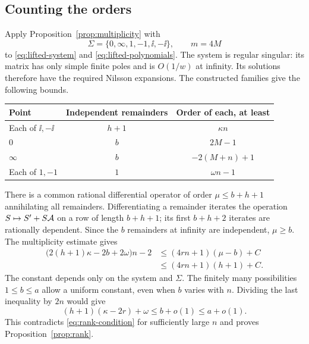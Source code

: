 \subsection{Counting the orders}

Apply Proposition~\ref{prop:multiplicity} with
\[
 \Sigma=\{0,\infty,1,-1,\ii,-\ii\},\qquad m=4M
\]
to \eqref{eq:lifted-system} and \eqref{eq:lifted-polynomials}.
The system is regular singular: its matrix has only simple finite poles
and is $O(1/w)$ at infinity. Its solutions therefore have the required
Nilsson expansions.
The constructed families give the following bounds.
\begin{center}
\begin{tabular}{@{}lcc@{}}
\toprule
Point & Independent remainders & Order of each, at least\\
\midrule
Each of $\ii,-\ii$ & $h+1$ & $\kappa n$\\
$0$ & $b$ & $2M-1$\\
$\infty$ & $b$ & $-2(M+n)+1$\\
Each of $1,-1$ & $1$ & $\omega n-1$\\
\bottomrule
\end{tabular}
\end{center}

There is a common rational differential operator of order
$\mu\leq b+h+1$ annihilating all remainders.
Differentiating a remainder iterates the operation
$S\mapsto S'+S\mathcal A$ on a row of length $b+h+1$; its first $b+h+2$
iterates are rationally dependent.
Since the $b$ remainders at infinity are independent, $\mu\geq b$.
The multiplicity estimate gives
\begin{align*}
 \bigl(2(h+1)\kappa-2b+2\omega\bigr)n-2
   &\leq(4rn+1)(\mu-b)+C\\
   &\leq(4rn+1)(h+1)+C.
\end{align*}
The constant depends only on the system and $\Sigma$.
The finitely many possibilities $1\leq b\leq a$ allow a uniform constant,
even when $b$ varies with $n$.
Dividing the last inequality by $2n$ would give
\[
 (h+1)(\kappa-2r)+\omega\leq b+o(1)\leq a+o(1).
\]
This contradicts \eqref{eq:rank-condition} for sufficiently large $n$
and proves Proposition~\ref{prop:rank}.

